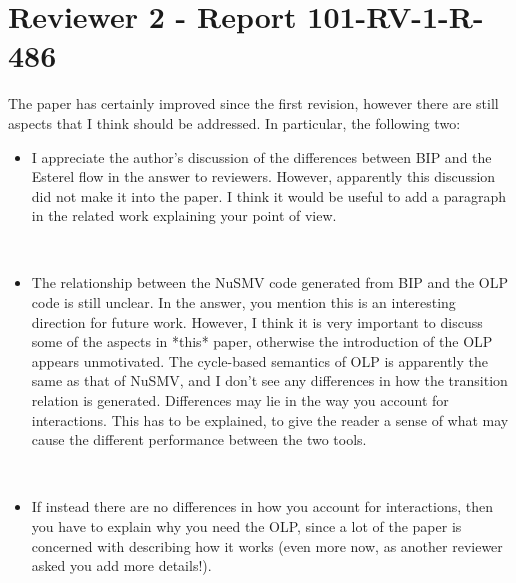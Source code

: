 \section{Reviewer 2 - Report 101-RV-1-R-486}
%
%
The paper has certainly improved since the first revision, however there are
still aspects that I think should be addressed. In particular, the following
two:

\begin{itemize}
\item I appreciate the author's discussion of the differences between BIP and the
Esterel flow in the answer to reviewers. However, apparently this discussion
did not make it into the paper. I think it would be useful to add a paragraph
in the related work explaining your point of view.

~


\item The relationship between the NuSMV code generated from BIP and the OLP code
is still unclear. In the answer, you mention this is an interesting direction
for future work. However, I think it is very important to discuss some of the
aspects in *this* paper, otherwise the introduction of the OLP appears
unmotivated. 
The cycle-based semantics of OLP is apparently the same as that
of NuSMV, and I don't see any differences in how the transition relation is
generated. Differences may lie in the way you account for interactions. This
has to be explained, to give the reader a sense of what may cause the
different performance between the two tools. 

~

    
\item If instead there are no
differences in how you account for interactions, then you have to explain why
you need the OLP, since a lot of the paper is concerned with describing how it
works (even more now, as another reviewer asked you add more details!).

~



\end{itemize}
